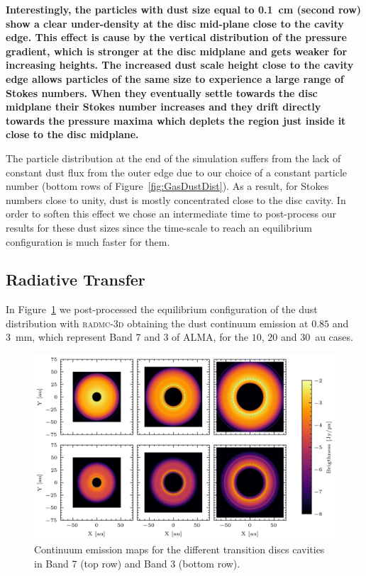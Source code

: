 \documentclass[fleqn,usenatbib]{mnras}
\begin{document}
        \textbf{Interestingly, the particles with dust size equal to \SI{0.1}{cm} (second row) show a clear under-density at the disc mid-plane close to the cavity edge. This effect is cause by the vertical distribution of the pressure gradient, which is stronger at the disc midplane and gets weaker for increasing heights. The increased dust scale height close to the cavity edge allows particles of the same size to experience a large range of Stokes numbers. When they eventually settle towards the disc midplane their Stokes number increases and they drift directly towards the pressure maxima which deplets the region just inside it close to the disc midplane.}
        
        The particle distribution at the end of the simulation suffers from the lack of constant dust flux from the outer edge due to our choice of a constant particle number (bottom rows of Figure~\ref{fig:GasDustDist}). As a result, for Stokes numbers close to unity, dust is mostly concentrated close to the disc cavity. In order to soften this effect we chose an intermediate time to post-process our results for these dust sizes since the time-scale to reach an equilibrium configuration is much faster for them.
  
    \subsection{Radiative Transfer} \label{sec:radiative-transfer}
        In Figure~\ref{fig:DustContinuum} we post-processed the equilibrium configuration of the dust distribution with \textsc{radmc-3d} obtaining the dust continuum emission at $0.85$ and \SI{3}{mm}, which represent Band 7 and 3 of ALMA, for the $10$, $20$ and \SI{30}{au} cases.
        
        \begin{figure}
            \centering
            \includegraphics[width=\textwidth]{Fig4}
            \caption{Continuum emission maps for the different transition discs cavities in Band 7 (top row) and Band 3 (bottom row).}
            \label{fig:DustContinuum}
        \end{figure}
        
\end{document}
